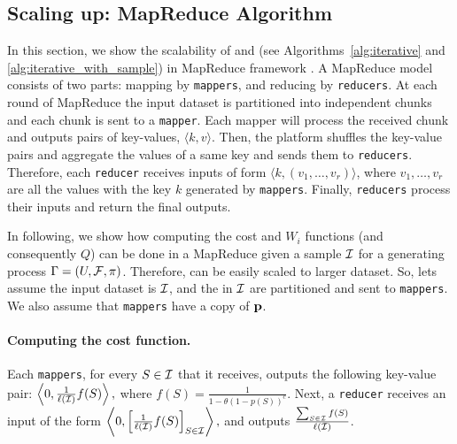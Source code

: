 \subsection{Scaling up: MapReduce Algorithm}\label{sec:mapreduce}
In this section, we show the scalability of {\optimizer} and {\appoptimizer} (see Algorithms~\ref{alg:iterative} and \ref{alg:iterative_with_sample}) in MapReduce framework \cite{dean2008mapreduce}. A MapReduce model consists of two parts: mapping by \texttt{mappers}, and reducing by \texttt{reducers}. At each round of MapReduce the input dataset is partitioned into independent chunks and each chunk is sent to a \texttt{mapper}. Each mapper will process the received chunk and outputs pairs of key-values, $\langle k, v \rangle$. Then, the  platform shuffles the key-value pairs and aggregate the values of a same key and sends them to \texttt{reducers}. Therefore, each \texttt{reducer} receives inputs of form $\langle k, (v_1, \ldots, v_r) \rangle$, where $v_1, \ldots, v_r$ are all the values with the key $k$ generated by \texttt{mappers}. Finally, \texttt{reducers} process their inputs and return the final outputs.

In following, we show how computing the cost and $W_i$ functions (and consequently $Q$)  can be done in a MapReduce given a sample $\mathcal{I}$ for a generating process $\Gamma=(U,\mathcal{F},\pi)$. Therefore, {\appoptimizer} can be easily scaled to larger dataset.
So, lets assume the input dataset is $\mathcal{I}$, and the {\ins} in $\mathcal{I}$ are partitioned and sent to \texttt{mappers}. We also assume that \texttt{mappers} have a copy of $\mathbf{p}$. 


\paragraph{\bf Computing the cost function.}
Each \texttt{mappers}, for every $S\in \mathcal{I}$ that it receives, outputs the following key-value pair:
$\left\langle 0,  \frac{1}{\ell(\mathcal{I})}f(S) \right\rangle,$
where $f(S) = \frac{1}{1- \theta(1-p(S))^c}$.
Next, a \texttt{reducer} receives an input of the form 
$\left\langle 0,  \left[\frac{1}{\ell(\mathcal{I})}f(S)\right]_{S\in \mathcal{I}}  \right\rangle,$
and outputs $\frac{\sum_{S\in \mathcal{I}}f(S)}{\ell(\mathcal{I})}$.

